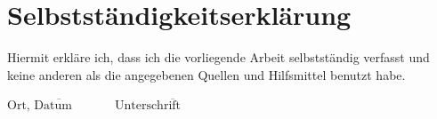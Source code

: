 \section*{Selbstständigkeitserklärung}

Hiermit erkläre ich, dass ich die vorliegende Arbeit selbstständig verfasst und keine anderen als die angegebenen Quellen und Hilfsmittel benutzt habe.\vspace{2cm}

$\overline{\mbox{Ort, Datum}~~~~~~~~~~~~~~}$ \hfill $\overline{\mbox{Unterschrift}~~~~~~~~~~~~~~~~~~}$
 \hspace{2cm}